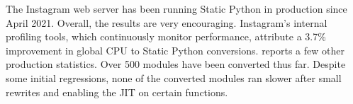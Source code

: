 \documentclass[english,cleveref,submission]{programming}
\newcommand{\SP}{Static Python}
\newcommand{\CPUchange}{3.7\%}
\begin{document}



The Instagram web server has been running \SP{} in production since April 2021.
Overall, the results are very encouraging.
Instagram's internal profiling tools, which continuously monitor
performance, attribute a \CPUchange{} improvement in global CPU to \SP{} conversions.
 reports a few other production statistics.
Over 500 modules have been converted thus far.
Despite some initial regressions, none of the converted modules
ran slower after small rewrites and enabling the JIT on certain functions.
\end{document}
